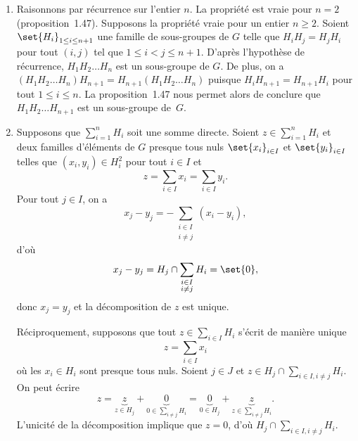 
\begin{enumerate}
  \item %
    Raisonnons par récurrence sur l'entier $n$.
    La propriété est vraie pour $n = 2$ (proposition~1.47).
    Supposons la propriété vraie pour un entier $n\geq 2$.
    Soient $\set{H_i}_{1\leq i\leq n + 1}$ une famille de sous-groupes de $G$ telle que $H_i H_j = H_j H_i$ pour tout $(i, j)$ tel que $1\leq i < j \leq n + 1$.
    D'après l'hypothèse de récurrence, $H_1H_2\dots H_n$ est un sous-groupe de $G$.
    De plus, on a $(H_1H_2\dots H_n)H_{n + 1} = H_{n + 1}(H_1H_2\dots H_n)$ puisque $H_iH_{n + 1} = H_{n + 1}H_i$ pour tout $1 \leq i \leq n$.
    La proposition~1.47 nous permet alors de conclure que $H_1H_2\dots H_{n + 1}$ est un sous-groupe de~$G$.

  \item %
    Supposons que $\sum_{i=1}^n H_i$ soit une somme directe.
    Soient $z\in\sum_{i=1}^n H_i$ et deux familles d'éléments de $G$ presque tous nuls $\set{x_i}_{i\in I}$ et $\set{y_i}_{i\in I}$ telles que $(x_i, y_i)\in H_i^2$ pour tout $i\in I$ et
    \[
      z = \sum_{i\in I} x_i = \sum_{i\in I} y_i.
    \]
    Pour tout $j\in I$, on a
    \[
      x_j - y_j = - \sum_{\substack{i\in I \\ i\neq j}} (x_i - y_i),
    \]
    d'où
    \[
      x_j - y_j = H_j \cap \sum_{\substack{i\in I \\ i\neq j}} H_i = \set{0},
    \]
    donc $x_j = y_j$ et la décomposition de $z$ est unique.

    Réciproquement, supposons que tout $z\in\sum_{i\in I} H_i$ s'écrit de manière unique
    \[
      z = \sum_{i\in I} x_i
    \]
    où les $x_i\in H_i$ sont presque tous nuls.
    Soient $j\in J$ et $z\in H_j \cap \sum_{i\in I, i\neq j} H_i$.
    On peut écrire
    \[
      z
        = \underbrace{z}_{z\in H_j} + \underbrace{0}_{0\in \sum_{i\neq j} H_i}
        = \underbrace{0}_{0\in H_j} + \underbrace{z}_{z\in \sum_{i\neq j} H_i}.
    \]
    L'unicité de la décomposition implique que $z = 0$, d'où $H_j\cap \sum_{i\in I, i\neq j} H_i$.
\end{enumerate}

